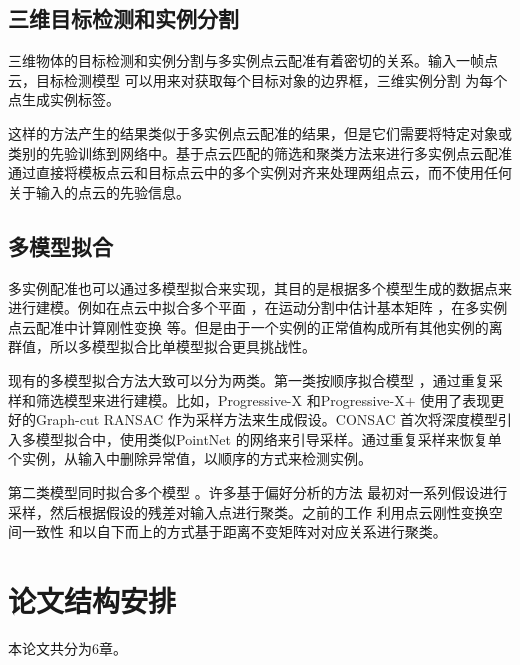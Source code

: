 \subsection{三维目标检测和实例分割}
三维物体的目标检测和实例分割与多实例点云配准有着密切的关系。输入一帧点云，目标检测模型 \cite{qi2019deep} 可以用来对获取每个目标对象的边界框，三维实例分割 \cite{wang2018sgpn,han2020occuseg} 为每个点生成实例标签。

这样的方法产生的结果类似于多实例点云配准的结果，但是它们需要将特定对象或类别的先验训练到网络中。基于点云匹配的筛选和聚类方法来进行多实例点云配准通过直接将模板点云和目标点云中的多个实例对齐来处理两组点云，而不使用任何关于输入的点云的先验信息。

\subsection{多模型拟合}
多实例配准也可以通过多模型拟合来实现，其目的是根据多个模型生成的数据点来进行建模。例如在点云中拟合多个平面 \cite{barath2018multi} ，在运动分割中估计基本矩阵 \cite{hartley1997defense} ，在多实例点云配准中计算刚性变换 \cite{tang2022multi} 等。但是由于一个实例的正常值构成所有其他实例的离群值，所以多模型拟合比单模型拟合更具挑战性。

现有的多模型拟合方法大致可以分为两类。第一类按顺序拟合模型 \cite{barath2019progressive,barath2021progressive,kanazawa2004detection,kluger2020consac} ，通过重复采样和筛选模型来进行建模。比如，Progressive-X \cite{barath2019progressive} 和Progressive-X+ \cite{barath2021progressive} 使用了表现更好的Graph-cut RANSAC \cite{barath2018graph} 作为采样方法来生成假设。CONSAC \cite{kluger2020consac} 首次将深度模型引入多模型拟合中，使用类似PointNet \cite{qi2017pointnet} 的网络来引导采样。通过重复采样来恢复单个实例，从输入中删除异常值，以顺序的方式来检测实例。

第二类模型同时拟合多个模型 \cite{tang2022multi,toldo2008robust,magri2016multiple,magri2014t,magri2015robust} 。许多基于偏好分析的方法 \cite{toldo2008robust,magri2015robust} 最初对一系列假设进行采样，然后根据假设的残差对输入点进行聚类。之前的工作 \cite{tang2022multi} 利用点云刚性变换空间一致性 \cite{leordeanu2005spectral} 和以自下而上的方式基于距离不变矩阵对对应关系进行聚类。\\
\section{论文结构安排}
本论文共分为6章。

